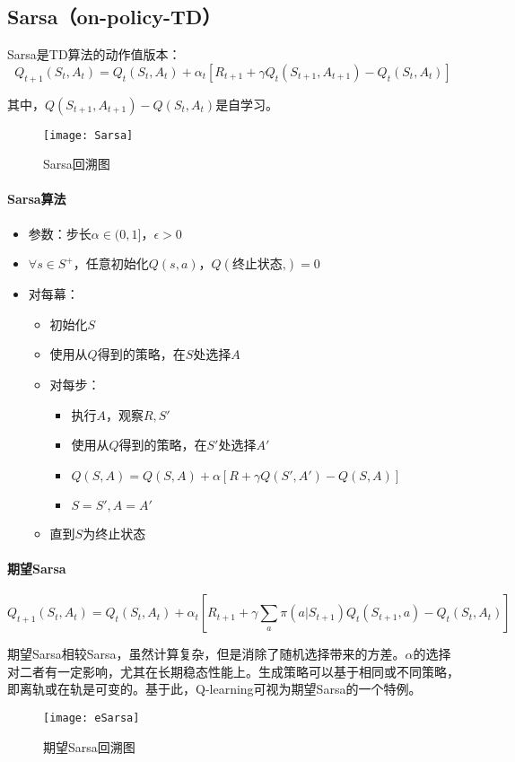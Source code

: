 \documentclass[
12pt, %
a4paper, 
oneside, %
headinclude,footinclude, %
]{scrartcl}
\begin{document}
\subsection{Sarsa（on-policy-TD）}
Sarsa是TD算法的动作值版本：
$$
Q_{t + 1}(S_t, A_t) = Q_t(S_t, A_t) + \alpha_t[R_{t + 1} + \gamma Q_t(S_{t + 1}, A_{t + 1}) - Q_t(S_t, A_t)]
$$

其中，$ Q(S_{t + 1}, A_{t + 1}) - Q(S_t, A_t) $是自学习。

\begin{figure}[H]
\centering
\texttt{[image: Sarsa]}
\caption[Sarsa回溯图]{Sarsa回溯图}
\end{figure}
\paragraph{Sarsa算法}
\begin{itemize}
\item 参数：步长$ \alpha \in (0,1] $，$ \epsilon > 0 $
\item $ \forall s \in S^+ $，任意初始化$ Q(s,a) $，$ Q(\text{终止状态,}) = 0 $
\item 对每幕：
\begin{itemize}
\item 初始化$ S $
\item 使用从$ Q $得到的策略，在$ S $处选择$ A $
\item 对每步：
\begin{itemize}
\item 执行$ A $，观察$ R,S' $
\item 使用从$ Q $得到的策略，在$ S' $处选择$ A' $
\item $ Q(S, A) = Q(S, A) + \alpha [R + \gamma Q(S', A') - Q(S, A)] $
\item $ S = S', A = A' $
\end{itemize}
\item 直到$ S $为终止状态
\end{itemize}
\end{itemize}
\paragraph{期望Sarsa}
$$
Q_{t + 1}(S_t, A_t) = Q_t(S_t, A_t) + \alpha_t[R_{t + 1} + \gamma \sum_a \pi(a|S_{t+1}) Q_t(S_{t + 1}, a) - Q_t(S_t, A_t)]
$$

期望Sarsa相较Sarsa，虽然计算复杂，但是消除了随机选择带来的方差。$ \alpha $的选择对二者有一定影响，尤其在长期稳态性能上。生成策略可以基于相同或不同策略，即离轨或在轨是可变的。基于此，Q-learning可视为期望Sarsa的一个特例。
\begin{figure}[H]
\centering
\texttt{[image: eSarsa]}
\caption[期望Sarsa回溯图]{期望Sarsa回溯图}
\end{figure}
\end{document}
